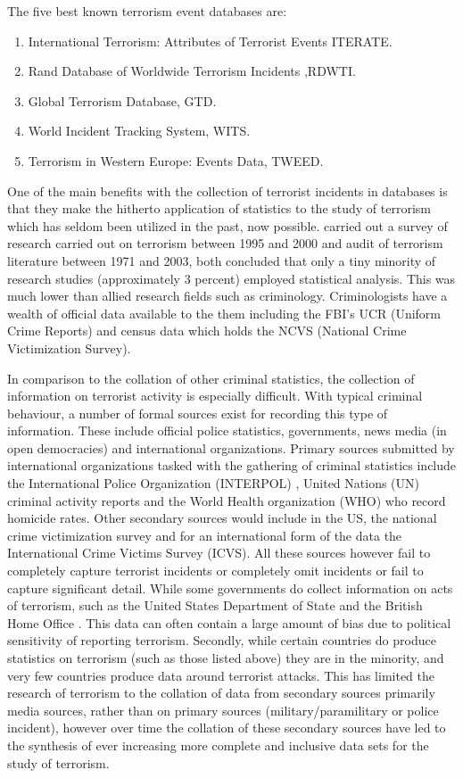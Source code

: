 The five best known terrorism event databases are:
\begin{enumerate}
\item  International Terrorism: Attributes of Terrorist Events ITERATE.
\item Rand Database of Worldwide Terrorism Incidents ,RDWTI.
\item Global Terrorism Database, GTD.
\item World Incident Tracking System, WITS.
\item Terrorism in Western Europe: Events Data, TWEED.
\end{enumerate}

One of the main benefits with the collection of terrorist incidents in databases is that they make the hitherto application of statistics to the study of terrorism which has seldom been utilized in the past, now possible. \citep{silke2001devil} carried out a survey of research carried out on terrorism between 1995 and 2000 and \citep{lum2006counter} audit of terrorism literature between 1971 and 2003, both concluded that only a tiny minority of research studies (approximately 3 percent) employed statistical analysis. This was much lower than allied research fields such as criminology. Criminologists have a wealth of official data available to the them including the FBI's UCR (Uniform Crime Reports) and census data which holds the NCVS (National Crime Victimization Survey).

In comparison to the collation of other criminal statistics, the collection of information on terrorist activity is especially difficult. With typical criminal behaviour, a number of formal sources exist for recording this type of information. These include official police statistics, governments, news media (in open democracies) and  international organizations. Primary sources submitted by international organizations tasked with the gathering of criminal statistics include the International Police Organization (INTERPOL) \citep{bresler1992interpol}, United Nations (UN) criminal activity reports \citep{united2013global} and the World Health organization (WHO) who record homicide rates. Other secondary sources would include in the US, the national crime victimization survey and for an international form of the data the International Crime Victims Survey (ICVS). All these sources however fail to completely capture terrorist incidents or completely omit incidents or fail to capture significant detail. While some governments do collect information on acts of terrorism, such as the United States Department of State and the British Home Office \citep{Homeoffice2016}. This data can often contain a large amount of bias due to political sensitivity of reporting terrorism. Secondly, while certain countries do produce statistics on terrorism (such as those listed above) they are in the minority, and very few countries produce data around terrorist attacks. This has limited the research of terrorism to the collation of data from secondary sources primarily media sources, rather than on primary sources (military/paramilitary or police incident), however over time the collation of these secondary sources have led to the synthesis of ever increasing more complete and inclusive data sets for the study of terrorism.


